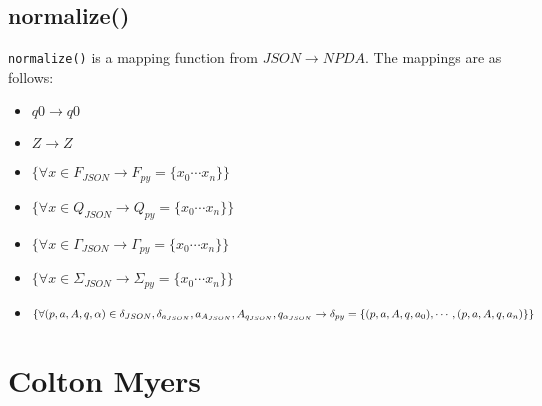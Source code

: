 \documentclass[a4paper]{report}
\begin{document}
\subsection*{normalize()}
\texttt{normalize()} is a mapping function from $JSON\rightarrow NPDA$. The
mappings are as follows:
\begin{itemize}
    \item $q0\rightarrow q0$
    \item $Z\rightarrow Z$
    \item $\{\forall x\in F_{JSON} \rightarrow F_{py}=\{x_0\cdots x_n\}\}$
    \item $\{\forall x\in Q_{JSON} \rightarrow Q_{py}=\{x_0\cdots x_n\}\}$
    \item $\{\forall x\in\Gamma_{JSON} \rightarrow \Gamma_{py}=\{x_0\cdots x_n\}\}$
    \item $\{\forall x\in\Sigma_{JSON} \rightarrow \Sigma_{py}=\{x_0\cdots x_n\}\}$
    \item $\{\forall (p,a,A,q,\alpha)\in\delta_{JSON},\delta_{a_{JSON}},
                a_{A_{JSON}},
                A_{q_{JSON}},
                q_{\alpha_{JSON}} \rightarrow\\
                \delta_{py}=\{(p,a,A,q,a_0),\cdots,(p,a,A,q,a_n)\}\}$
\end{itemize}
\section*{Colton Myers}
\end{document}
